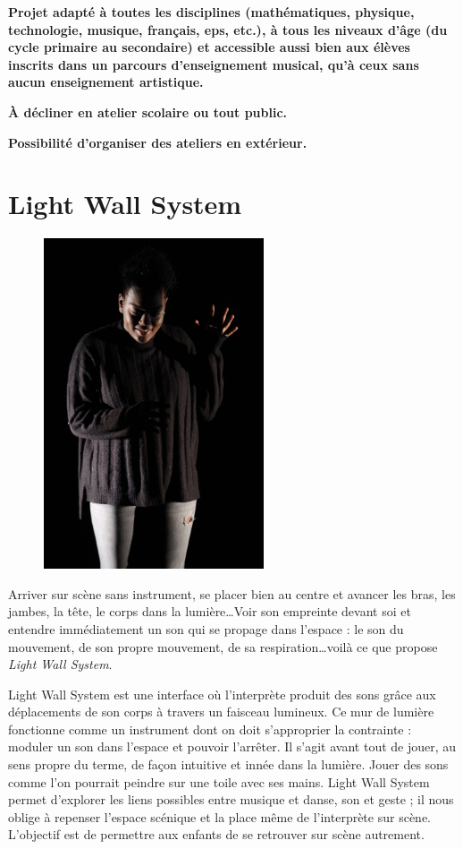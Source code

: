 \documentclass[fontsize=12pt]{scrartcl} %
\numberwithin{equation}{section} %
\numberwithin{table}{section} %
\begin{document}
\noindent
\textbf{Projet adapté à toutes les disciplines (mathématiques, physique, technologie, musique, français, eps, etc.), à tous les niveaux d'âge (du cycle primaire au secondaire) et accessible aussi bien aux élèves inscrits dans un parcours d'enseignement musical, qu'à ceux sans aucun enseignement artistique.}

\noindent 
\textbf{À décliner en atelier scolaire ou tout public.}
 
\noindent 
\textbf{Possibilité d'organiser des ateliers en extérieur.}

\pagebreak

\section{Light Wall System}
\label{app:lightwall}

\begin{figure}
\centering
\includegraphics[width=6.5cm]{img/lightwall}
\label{fig:lightwall}
\end{figure}

Arriver sur scène sans instrument, se placer bien au centre et avancer les bras, les jambes, la tête, le corps dans la lumière\dots Voir son empreinte devant soi et entendre immédiatement un son qui se propage dans l'espace : le son du mouvement, de son propre mouvement, de sa respiration\dots voilà ce que propose \textit{Light Wall System}.

Light Wall System est une interface où l'interprète produit des sons grâce aux déplacements de son corps à travers un faisceau lumineux. Ce mur de lumière fonctionne comme un instrument dont on doit s'approprier la contrainte : moduler un son dans l'espace et pouvoir l'arrêter. Il s'agit avant tout de jouer, au sens propre du terme, de façon intuitive et innée dans la lumière. Jouer des sons comme l'on pourrait peindre sur une toile avec ses mains. Light Wall System permet d'explorer les liens possibles entre musique et danse, son et geste ; il nous oblige à repenser l'espace scénique et la place même de l'interprète sur scène. L'objectif est de permettre aux enfants de se retrouver sur scène autrement.
\end{document}
